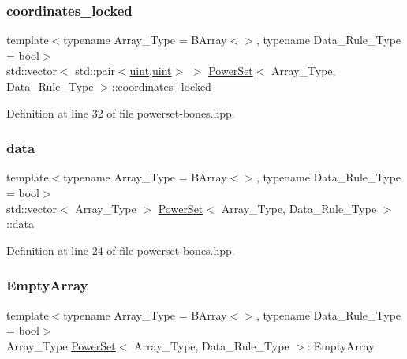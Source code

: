 \mbox{\label{class_power_set_ac5cdec06502e8bd20e36fca3abbb9a3e}} 
\subsubsection{\texorpdfstring{coordinates\+\_\+locked}{coordinates\_locked}}
{\footnotesize\ttfamily template$<$typename Array\+\_\+\+Type  = B\+Array$<$$>$, typename Data\+\_\+\+Rule\+\_\+\+Type  = bool$>$ \\
std\+::vector$<$ std\+::pair$<$\hyperlink{typedefs_8hpp_a91ad9478d81a7aaf2593e8d9c3d06a14}{uint},\hyperlink{typedefs_8hpp_a91ad9478d81a7aaf2593e8d9c3d06a14}{uint}$>$ $>$ \hyperlink{class_power_set}{Power\+Set}$<$ Array\+\_\+\+Type, Data\+\_\+\+Rule\+\_\+\+Type $>$\+::coordinates\+\_\+locked}



Definition at line 32 of file powerset-\/bones.\+hpp.

\mbox{\label{class_power_set_af456c157d157692ba5890c549c51af75}} 
\subsubsection{\texorpdfstring{data}{data}}
{\footnotesize\ttfamily template$<$typename Array\+\_\+\+Type  = B\+Array$<$$>$, typename Data\+\_\+\+Rule\+\_\+\+Type  = bool$>$ \\
std\+::vector$<$ Array\+\_\+\+Type $>$ \hyperlink{class_power_set}{Power\+Set}$<$ Array\+\_\+\+Type, Data\+\_\+\+Rule\+\_\+\+Type $>$\+::data}



Definition at line 24 of file powerset-\/bones.\+hpp.

\mbox{\label{class_power_set_a367db2c97e0301dd0dd78e5e4b458d34}} 
\subsubsection{\texorpdfstring{Empty\+Array}{EmptyArray}}
{\footnotesize\ttfamily template$<$typename Array\+\_\+\+Type  = B\+Array$<$$>$, typename Data\+\_\+\+Rule\+\_\+\+Type  = bool$>$ \\
Array\+\_\+\+Type \hyperlink{class_power_set}{Power\+Set}$<$ Array\+\_\+\+Type, Data\+\_\+\+Rule\+\_\+\+Type $>$\+::Empty\+Array}



